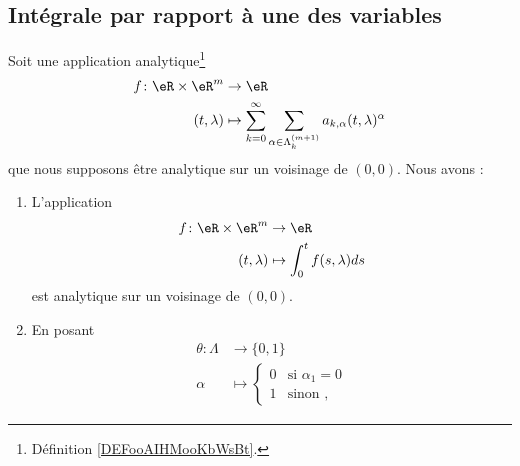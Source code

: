 \subsection{Intégrale par rapport à une des variables}


\begin{proposition}	\label{PROPooBHKJooUZUKnc}
	Soit une application analytique\footnote{Définition \ref{DEFooAIHMooKbWsBt}.}
	\begin{equation}
		\begin{aligned}
			f\colon \eR\times \eR^m & \to \eR                                                                                        \\
			(t,\lambda)             & \mapsto \sum_{k=0}^{\infty}\sum_{\alpha\in\Lambda^{(m+1)}_{k}}a_{k,\alpha}(t,\lambda)^{\alpha}
		\end{aligned}
	\end{equation}
	que nous supposons être analytique sur un voisinage de \( (0,0)\). Nous avons :
	\begin{enumerate}
		\item		\label{ITEMooMWMSooRoXLgL}
		      L'application
		      \begin{equation}
			      \begin{aligned}
				      f\colon \eR\times \eR^m & \to \eR                         \\
				      (t,\lambda)             & \mapsto \int_0^t f(s,\lambda)ds
			      \end{aligned}
		      \end{equation}
		      est analytique sur un voisinage de \( (0,0)\).
		\item		\label{ITEMooSRHFooAjKHFg}
		      En posant
		      \begin{equation}
			      \begin{aligned}
				      \theta\colon \Lambda & \to\{ 0,1 \}                      \\
				      \alpha               & \mapsto \begin{cases}
					                                     0 & \text{si } \alpha_1=0 \\
					                                     1 & \text{sinon },
				                                     \end{cases}
			      \end{aligned}
		      \end{equation}

\end{enumerate}
\end{proposition}
